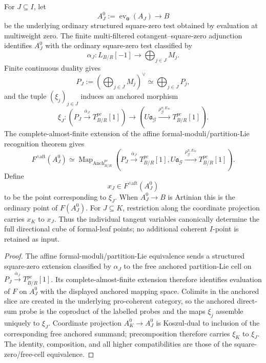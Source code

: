 \begin{construction}
\label{constr:symmetry-noether-compatible-formal-leaf-points-of-a-labelled-tangent-tuple}
For $J\subseteq I$, let
\[
A_J^{0}:=\operatorname{ev}_{\mathbf0}(A_J)\longrightarrow B
\]
be the underlying ordinary structured square-zero test obtained by evaluation at
multiweight zero.  The finite multi-filtered cotangent--square-zero adjunction
identifies $A_J^{0}$ with the ordinary square-zero test classified by
\[
\alpha_J:
L_{B/R}[-1]
\longrightarrow
\bigoplus_{j\in J}M_j.
\]
Finite continuous duality gives
\[
P_J:=\left(\bigoplus_{j\in J}M_j\right)^\vee
\simeq
\bigoplus_{j\in J}P_j,
\]
and the tuple $(\xi_j)_{j\in J}$ induces an anchored morphism
\[
\xi_J:
\left(
P_J\xrightarrow{\bar\alpha_J}T^{pc}_{B/R}[1]
\right)
\longrightarrow
\left(
U\mathfrak a_{\mathcal G}
\xrightarrow{\rho_{\mathcal G}^{\pi,E_\infty}}
T^{pc}_{B/R}[1]
\right).
\]
The complete-almost-finite extension of the affine formal-moduli/partition-Lie
recognition theorem gives
\[
F^{\wedge\mathrm{aft}}(A_J^{0})
\simeq
\operatorname{Map}_{\operatorname{Anch}^{pc}_{B/R}}
\left(
P_J\xrightarrow{\bar\alpha_J}T^{pc}_{B/R}[1],
U\mathfrak a_{\mathcal G}
\xrightarrow{\rho_{\mathcal G}^{\pi,E_\infty}}
T^{pc}_{B/R}[1]
\right).
\]
Define
\[
\boxed{
x_J\in F^{\wedge\mathrm{aft}}(A_J^{0})
}
\]
to be the point corresponding to $\xi_J$.  When $A_J^{0}\to B$ is Artinian this is
the ordinary point of $F(A_J^{0})$.  For $J\subseteq K$, restriction along the
coordinate projection carries $x_K$ to $x_J$.  Thus the individual tangent
variables canonically determine the full directional cube of formal-leaf points;
no additional coherent $I$-point is retained as input.
\end{construction}

\begin{proof}
The affine formal-moduli/partition-Lie equivalence sends a structured square-zero
extension classified by $\alpha_J$ to the free anchored partition-Lie cell on
$P_J\xrightarrow{\bar\alpha_J}T^{pc}_{B/R}[1]$.  Its complete-almost-finite
extension therefore identifies evaluation of $F$ on $A_J^{0}$ with the displayed
anchored mapping space.  Colimits in the anchored slice are created in the
underlying pro-coherent category, so the anchored direct-sum probe is the coproduct
of the labelled probes and the maps $\xi_j$ assemble uniquely to $\xi_J$.
Coordinate projection $A_K^{0}\to A_J^{0}$ is Koszul-dual to inclusion of the
corresponding free anchored summand; precomposition therefore carries $\xi_K$ to
$\xi_J$.  The identity, composition, and all higher compatibilities are those of
the square-zero/free-cell equivalence.
\end{proof}

